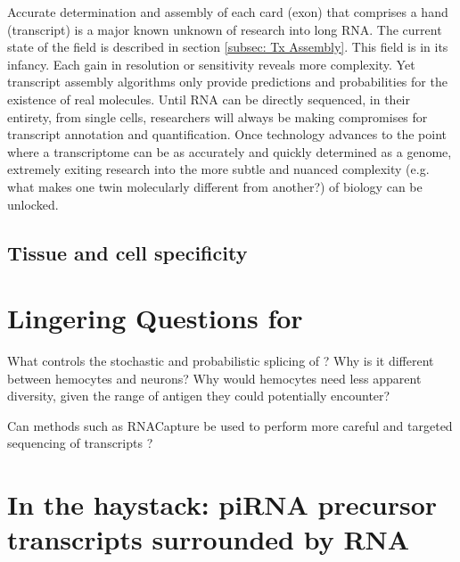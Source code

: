     Accurate determination and assembly of each card (exon) that comprises a hand (transcript) is a major known unknown of research into long RNA. The current state of the field is described in section \ref{subsec: Tx Assembly}. This field is in its infancy. Each gain in resolution or sensitivity reveals more complexity. Yet transcript assembly algorithms only provide predictions and probabilities for the existence of real molecules. Until RNA can be directly sequenced, in their entirety, from single cells, researchers will always be making compromises for transcript annotation and quantification. Once technology advances to the point where a transcriptome can be as accurately and quickly determined as a genome, extremely exiting research into the more subtle and nuanced complexity (e.g. what makes one twin molecularly different from another?) of biology can be unlocked.


  \subsection{Tissue and cell specificity}\label{Disc:subsec:Tissue-specific Tx expression}


\section{Lingering Questions for \dscam{}}\label{Disc:sec:Dscam}

  What controls the stochastic and probabilistic splicing of \dscam{}? Why is it different between hemocytes and neurons? Why would hemocytes need less apparent diversity, given the range of antigen they could potentially encounter?

  Can methods such as RNACapture be used to perform more careful and targeted sequencing of \dscam{} transcripts \citep{Mercer2014}?


\section{In the haystack: piRNA precursor transcripts surrounded by RNA}\label{Disc:sec:piRNA precursors}


